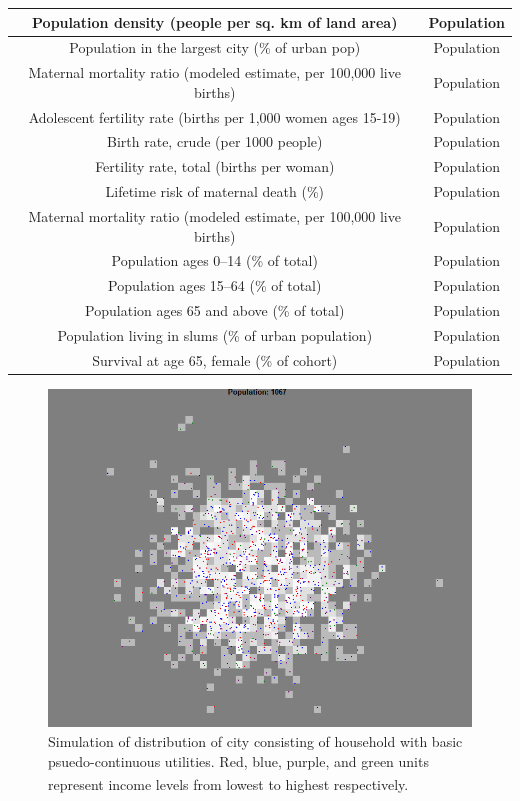 \begin{longtable}{||c|c||}
        \hline
            Population density (people per sq. km of land area) & Population \\
        \hline
            Population in the largest city (\% of urban pop) & Population\\
        \hline
            Maternal mortality ratio (modeled estimate, per 100,000 live births) & Population \\
        \hline
            Adolescent fertility rate (births per 1,000 women ages 15-19) & Population\\
        \hline
            Birth rate, crude (per 1000 people) & Population\\
        \hline
            Fertility rate, total (births per woman) & Population \\
        \hline
            Lifetime risk of maternal death (\%) & Population\\
        \hline
            Maternal mortality ratio (modeled estimate, per 100,000 live births) & Population \\
        \hline
            Population ages 0–14 (\% of total) & Population\\
        \hline
            Population ages 15–64 (\% of total) & Population \\
        \hline
            Population ages 65 and above (\% of total) & Population \\
        \hline
            Population living in slums (\% of urban population) & Population\\
        \hline
            Survival at age 65, female (\% of cohort) & Population \\
        \hline
        
        \end{longtable}


\begin{figure}
    \centering
    \includegraphics[scale = 0.8]{Graphics/city sim basic.png}
    \caption{Simulation of distribution of city consisting of household with basic psuedo-continuous utilities. Red, blue, purple, and green units represent income levels from lowest to highest respectively.\textsuperscript{\cite{pjcode}}}
    \label{fig:city sim}
\end{figure}
